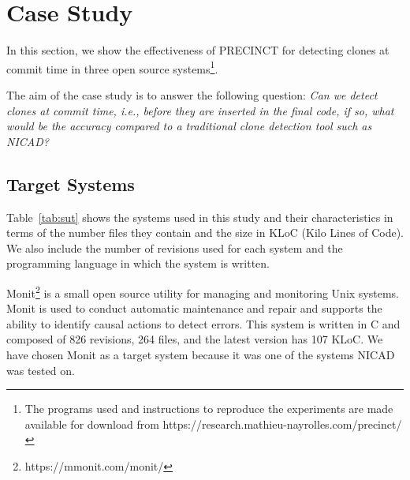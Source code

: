 \documentclass[conference]{IEEEtran}
\begin{document}
\section{Case Study}
\label{sec:Experimentations}

In this section, we show the effectiveness of PRECINCT for
detecting clones at commit time in three open source systems\footnote{The programs used and instructions to reproduce the experiments are made available for download from https://research.mathieu-nayrolles.com/precinct/}.

The aim of the case study is to answer the following question: \textit{Can we detect clones at commit time, i.e., before they are inserted in the final code, if so, what would be the accuracy compared to a traditional clone detection tool such as NICAD?}

\subsection{Target Systems}
\label{sub:Target Systems}

Table~\ref{tab:sut} shows the systems used in this study and their characteristics in terms of the number files they contain and the size in KLoC (Kilo Lines of Code). We also include the number of revisions used for each system and the programming language in which the system is written.

\begin{table}[]
\centering
\caption{List of Target Systems in Terms of Files and Kilo Line of Code (KLOC) at current version and Language}
\label{tab:sut}
\end{table}

Monit\footnote{https://mmonit.com/monit/} is a small open source utility for managing and monitoring Unix systems.
Monit is used to conduct automatic maintenance and repair and supports the ability to identify causal actions to detect errors.
This system is written in C and composed of 826 revisions, 264 files, and the latest version has 107 KLoC.
We have chosen Monit as a target system because it was one of the systems NICAD was tested on.
\end{document}
